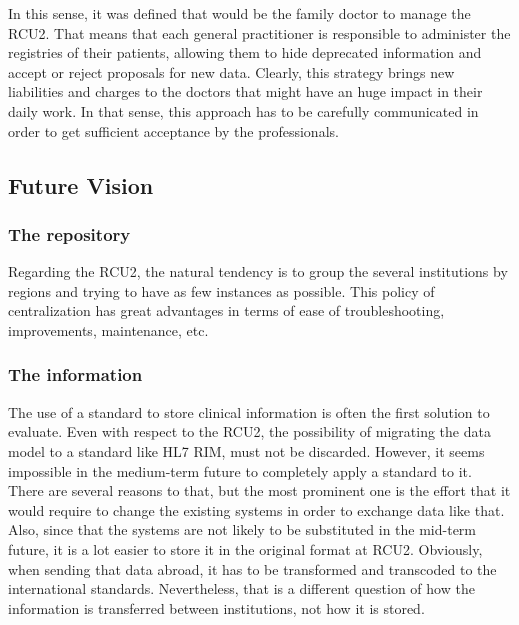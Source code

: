 In this sense, it was defined that would be the family doctor to manage the RCU2. That means that each general practitioner is responsible to administer the registries of their patients, allowing them to hide deprecated information and accept or reject proposals for new data. Clearly, this strategy brings new liabilities and charges to the doctors that might have an huge impact in their daily work. In that sense, this approach has to be carefully communicated in order to get sufficient acceptance by the professionals.









\subsection{Future Vision}

\subsubsection{The repository}

Regarding the RCU2, the natural tendency is to group the several institutions by regions and trying to have as few instances as possible. This policy of centralization has great advantages in terms of ease of troubleshooting, improvements, maintenance, etc. 


\subsubsection{The information}

The use of a standard to store clinical information is often the first solution to evaluate. Even with respect to the RCU2, the possibility of migrating the data model to a standard like HL7 RIM, must not be discarded. However, it seems impossible in the medium-term future to completely apply a standard to it. There are several reasons to that, but the most prominent one is the effort that it would require to change the existing systems in order to exchange data like that.
Also, since that the systems are not likely to be substituted in the mid-term future, it is a lot easier to store it in the original format at RCU2. Obviously, when sending that data abroad, it has to be transformed and transcoded to the international standards. Nevertheless, that is a different question of how the information is transferred between institutions, not how it is stored. 


